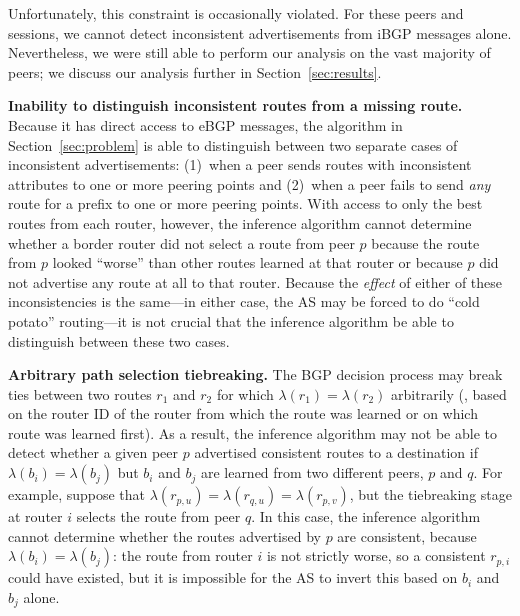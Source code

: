 Unfortunately, this constraint is occasionally violated.  For these
peers and sessions, we cannot detect inconsistent
advertisements from iBGP messages alone. Nevertheless, we were still
able to perform our analysis on the vast majority of peers; we discuss
our analysis further in Section~\ref{sec:results}.

{\bf Inability to distinguish inconsistent routes from a missing route.}
Because it has direct access to eBGP messages, the algorithm in
Section~\ref{sec:problem} is able to distinguish between two separate
cases of inconsistent advertisements: (1)~when a peer sends routes with
inconsistent attributes to one or more peering points and (2)~when a
peer fails to send {\em any} route for a prefix to one or more peering points.
With access to only the best routes from each router, however, the
inference algorithm cannot determine whether a border router did not select
a route from peer $p$ because the route from $p$ looked ``worse'' than
other routes learned at that router or because $p$ did not advertise any
route at all to that router.  Because the {\em effect} of either of
these inconsistencies is the same---in either case, the AS may be forced
to do ``cold potato'' routing---it is not crucial that the inference
algorithm be able to distinguish between these two cases.


{\bf Arbitrary path selection tiebreaking.}  The BGP decision process
may break ties between two routes $r_1$ and $r_2$ for which
$\lambda(r_1)=\lambda(r_2)$ arbitrarily (\eg, based on the router ID
of the router from which the route was learned or on which route was
learned first).  As a result, the inference algorithm may not be able
to detect whether a given peer $p$ advertised consistent routes to a
destination if $\lambda(b_i)=\lambda(b_j)$ but $b_i$ and $b_j$ are
learned from two different peers, $p$ and $q$.  For example, suppose
that $\lambda(r_{p,u})=\lambda(r_{q,u}) =\lambda(r_{p,v})$, but the
tiebreaking stage at router $i$ selects the route from peer $q$.  In
this case, the inference algorithm cannot determine whether the routes
advertised by $p$ are consistent, because $\lambda(b_i)=\lambda(b_j)$:
the route from router $i$ is not strictly worse, so a consistent
$r_{p,i}$ could have existed, but it is impossible for the AS to
invert this based on $b_i$ and $b_j$ alone.

